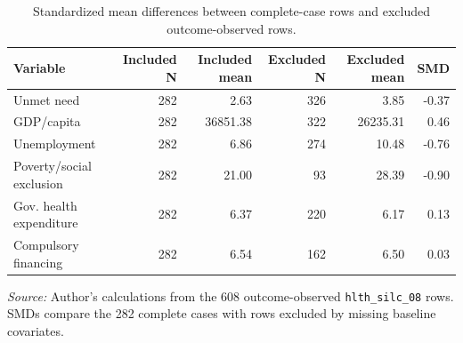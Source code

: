 \begin{table}[H]
\centering
\small
\caption{Standardized mean differences between complete-case rows and excluded outcome-observed rows.}
\label{tab:included_vs_excluded_smd}
\begin{tabular}{@{}lrrrrr@{}}
\toprule
Variable & Included N & Included mean & Excluded N & Excluded mean & SMD \\
\midrule
Unmet need & 282 & 2.63 & 326 & 3.85 & -0.37 \\
GDP/capita & 282 & 36851.38 & 322 & 26235.31 & 0.46 \\
Unemployment & 282 & 6.86 & 274 & 10.48 & -0.76 \\
Poverty/social exclusion & 282 & 21.00 & 93 & 28.39 & -0.90 \\
Gov. health expenditure & 282 & 6.37 & 220 & 6.17 & 0.13 \\
Compulsory financing & 282 & 6.54 & 162 & 6.50 & 0.03 \\
\bottomrule
\end{tabular}

\vspace{0.2em}
\begin{minipage}{0.92\textwidth}\scriptsize \textit{Source:} Author's calculations from the 608 outcome-observed \texttt{hlth\_silc\_08} rows. SMDs compare the 282 complete cases with rows excluded by missing baseline covariates.\end{minipage}
\end{table}
